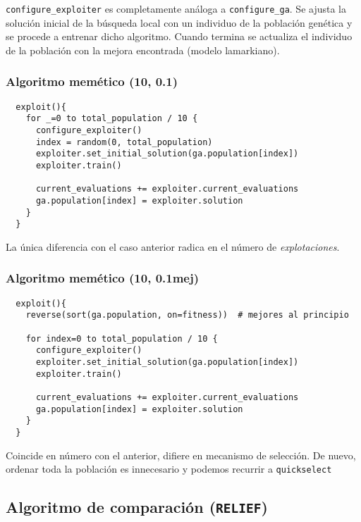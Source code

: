 \documentclass[11pt]{article}
\theoremstyle{plain}
\theoremstyle{definition}
\begin{document}
\texttt{configure\_exploiter} es completamente análoga a \texttt{configure\_ga}. Se ajusta la solución inicial de la búsqueda local con un individuo de la población genética y se procede a entrenar dicho algoritmo. Cuando termina se actualiza el individuo de la población con la mejora encontrada (modelo lamarkiano). \\

\subsubsection{Algoritmo memético (10, 0.1)}

\begin{lstlisting}
  exploit(){
    for _=0 to total_population / 10 {
      configure_exploiter()
      index = random(0, total_population)
      exploiter.set_initial_solution(ga.population[index])
      exploiter.train()

      current_evaluations += exploiter.current_evaluations
      ga.population[index] = exploiter.solution
    }
  }
\end{lstlisting}

La única diferencia con el caso anterior radica en el número de \textit{explotaciones}. \\

\subsubsection{Algoritmo memético (10, 0.1mej)}

\begin{lstlisting}
  exploit(){
    reverse(sort(ga.population, on=fitness))  # mejores al principio

    for index=0 to total_population / 10 {
      configure_exploiter()
      exploiter.set_initial_solution(ga.population[index])
      exploiter.train()

      current_evaluations += exploiter.current_evaluations
      ga.population[index] = exploiter.solution
    }
  }
\end{lstlisting}

Coincide en número con el anterior, difiere en mecanismo de selección.
De nuevo, ordenar toda la población es innecesario y podemos recurrir a \texttt{quickselect}

\subsection{Algoritmo de comparación (\texttt{RELIEF})}
\end{document}
